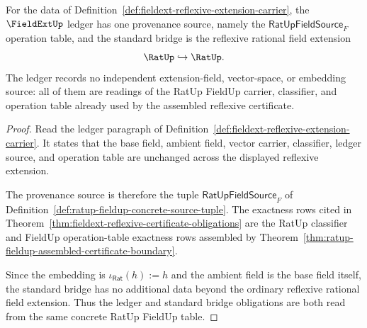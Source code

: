 \begin{theorem}
\label{thm:fieldext-reflexive-ledger-standard-bridge-obligations}
For the data of Definition~\ref{def:fieldext-reflexive-extension-carrier}, the
$\FieldExtUp$ ledger has one provenance source, namely the
$\mathsf{RatUpFieldSource}_F$ operation table, and the standard bridge is the
reflexive rational field extension
$$
\RatUp \hookrightarrow \RatUp .
$$
The ledger records no independent extension-field, vector-space, or embedding
source: all of them are readings of the RatUp FieldUp carrier, classifier, and
operation table already used by the assembled reflexive certificate.
\end{theorem}
\begin{proof}
Read the ledger paragraph of
Definition~\ref{def:fieldext-reflexive-extension-carrier}. It states that the
base field, ambient field, vector carrier, classifier, ledger source, and
operation table are unchanged across the displayed reflexive extension.

The provenance source is therefore the tuple
$\mathsf{RatUpFieldSource}_F$ of
Definition~\ref{def:ratup-fieldup-concrete-source-tuple}. The exactness rows
cited in Theorem~\ref{thm:fieldext-reflexive-certificate-obligations} are the
RatUp classifier and FieldUp operation-table exactness rows assembled by
Theorem~\ref{thm:ratup-fieldup-assembled-certificate-boundary}.

Since the embedding is $\iota_{\mathsf{Rat}}(h):=h$ and the ambient field is the
base field itself, the standard bridge has no additional data beyond the
ordinary reflexive rational field extension. Thus the ledger and standard
bridge obligations are both read from the same concrete RatUp FieldUp table.
\end{proof}

